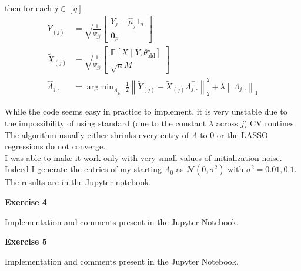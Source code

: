 \documentclass[10pt,notitlepage]{article}
\newcommand{\MBlue}[1]{{\color{MBlue}#1}}
\newcommand{\mean}[2][]{\mathbb{E}_{#1}\left[#2\right]}
\newcommand{\norm}[1]{\left\lVert #1\right\rVert}
\newcommand{\ZeroM}{\mathbf{0}}
\DeclareMathOperator*{\argmin}{arg\,min}
\begin{document}
\begin{exercise}[Solution]
\begin{itemize}
                    then for each $j\in[q]$
                    \begin{align*}
                        \tilde{Y}_{(j)} &= \sqrt{\frac{1}{\hat{\Psi}_{jj}}}
                        \begin{bmatrix}
                            Y_j-\hat{\mu}_j 1_n\\
                            \ZeroM_p
                        \end{bmatrix}\\
                        \tilde{X}_{(j)} &= \sqrt{\frac{1}{\hat{\Psi}_{jj}}}
                        \begin{bmatrix}
                            \mean{X\mid Y, \theta^\star_{\text{old}}}\\
                            \sqrt{n} M
                        \end{bmatrix}\\
                        \hat{\Lambda}_{j,\cdot} &= \argmin_{\Lambda_{j,\cdot}} \frac{1}{2}\norm{\tilde{Y}_{(j)} - \tilde{X}_{(j)}\Lambda_{j,\cdot}^\top}_2^2 + \lambda \norm{\Lambda_{j,\cdot}}_1
                    \end{align*}
        \end{itemize}
        While the code seems easy in practice to implement, it is very unstable due to the impossibility of using standard (due to the constant $\lambda$ across $j$) CV routines. The algorithm usually either shrinks every entry of $\Lambda$ to 0 or the LASSO regressions do not converge.\\
        I was able to make it work only with very small values of initialization noise. Indeed I generate the entries of my starting $\Lambda_0$ as $\mathcal{N}(0,\sigma^2)$ with $\sigma^2 = 0.01, 0.1$. The results are in the Jupyter notebook.
    \end{exercise}

    \newpage
    \textbf{\large \MBlue{Exercise 4}}
    \vskip10pt
    \noindent
	\begin{exercise}[Solution]
        Implementation and comments present in the Jupyter Notebook.
    \end{exercise}

    \newpage
    \textbf{\large \MBlue{Exercise 5}}
    \vskip10pt
    \noindent
	\begin{exercise}[Solution]
        Implementation and comments present in the Jupyter Notebook.
    \end{exercise}
\end{document}
